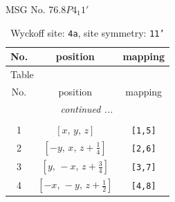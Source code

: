 \documentclass[fleqn,8pt]{jsarticle}
\begin{document}
\setcounter{MaxMatrixCols}{32}

\renewcommand{\tablename}{Table~}
\renewcommand{\figurename}{Figure~}
\begin{center}
\LARGE
MSG No. 76.8\quad$P4_{1}1'$
\end{center}
\renewcommand{\arraystretch}{1.2}
\begin{longtable}{ccc}
\caption{Wyckoff site: {\tt 4a}, site symmetry: {\tt 11'}}
 \\
 \hline \hline
No. & position & mapping \\ \hline \endfirsthead

\multicolumn{2}{l}{\tablename\ \thetable{}} \\
 \hline \hline
No. & position & mapping \\ \hline \endhead

 \hline \hline
\multicolumn{2}{r}{\footnotesize\it continued ...} \\ \endfoot

 \hline \hline
\multicolumn{2}{r}{} \\ \endlastfoot

1 & $\left[ x,\, y,\, z \right]$ & {\tt [1,5]} \\ \hline
2 & $\left[ - y,\, x,\, z + \frac{1}{4} \right]$ & {\tt [2,6]} \\ \hline
3 & $\left[ y,\, - x,\, z + \frac{3}{4} \right]$ & {\tt [3,7]} \\ \hline
4 & $\left[ - x,\, - y,\, z + \frac{1}{2} \right]$ & {\tt [4,8]} \\
\end{longtable}
\end{document}
